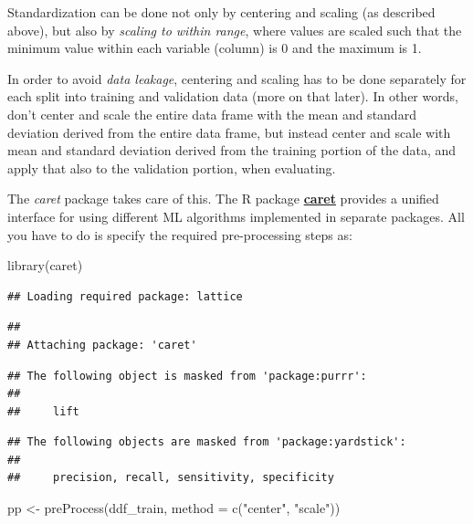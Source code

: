 \documentclass[
]{book}
\newenvironment{Shaded}{\begin{snugshade}}{\end{snugshade}}
\newcommand{\AttributeTok}[1]{\textcolor[rgb]{0.77,0.63,0.00}{#1}}
\newcommand{\FunctionTok}[1]{\textcolor[rgb]{0.00,0.00,0.00}{#1}}
\newcommand{\NormalTok}[1]{#1}
\newcommand{\OtherTok}[1]{\textcolor[rgb]{0.56,0.35,0.01}{#1}}
\newcommand{\StringTok}[1]{\textcolor[rgb]{0.31,0.60,0.02}{#1}}
\begin{document}
Standardization can be done not only by centering and scaling (as described above), but also by \emph{scaling to within range}, where values are scaled such that the minimum value within each variable (column) is 0 and the maximum is 1.

In order to avoid \emph{data leakage}, centering and scaling has to be done separately for each split into training and validation data (more on that later). In other words, don't center and scale the entire data frame with the mean and standard deviation derived from the entire data frame, but instead center and scale with mean and standard deviation derived from the training portion of the data, and apply that also to the validation portion, when evaluating.

The \emph{caret} package takes care of this. The R package \href{https://topepo.github.io/caret/}{\textbf{caret}} provides a unified interface for using different ML algorithms implemented in separate packages. All you have to do is specify the required pre-processing steps as:

\begin{Shaded}
\begin{Highlighting}[]
\FunctionTok{library}\NormalTok{(caret)}
\end{Highlighting}
\end{Shaded}

\begin{verbatim}
## Loading required package: lattice
\end{verbatim}

\begin{verbatim}
## 
## Attaching package: 'caret'
\end{verbatim}

\begin{verbatim}
## The following object is masked from 'package:purrr':
## 
##     lift
\end{verbatim}

\begin{verbatim}
## The following objects are masked from 'package:yardstick':
## 
##     precision, recall, sensitivity, specificity
\end{verbatim}

\begin{Shaded}
\begin{Highlighting}[]
\NormalTok{pp }\OtherTok{\textless{}{-}} \FunctionTok{preProcess}\NormalTok{(ddf\_train, }\AttributeTok{method =} \FunctionTok{c}\NormalTok{(}\StringTok{"center"}\NormalTok{, }\StringTok{"scale"}\NormalTok{))}
\end{Highlighting}
\end{Shaded}
\end{document}
